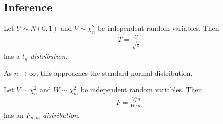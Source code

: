 \subsection{Inference}
\begin{definition}
	Let $U \sim N(0,1)$ and $V \sim \chi^2_n$ be independent random variables.
	Then
	\begin{align*}
		T = \frac{U}{\sqrt{\frac{V}{n}}}
	\end{align*}
	has a \textit{$t_n$-distribution}.
\end{definition}
As $n \to \infty$, this approaches the standard normal distribution.
\begin{definition}
	Let $V \sim \chi^2_n$ and $W \sim \chi^2_m$ be independent random variables.
	Then
	\begin{align*}
		F = \frac{V/n}{W/m}
	\end{align*}
	has an \textit{$F_{n,m}$-distribution}.
\end{definition}
